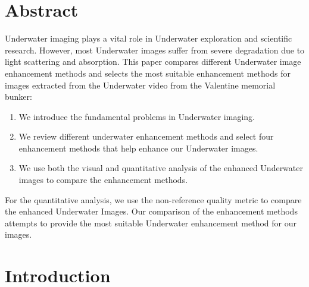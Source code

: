 \documentclass[a4paper,11pt,oneside]{article}
\begin{document}
  \section*{Abstract}
  

  Underwater imaging plays a vital role in Underwater exploration and scientific research. However, most Underwater images suffer from severe degradation due to light scattering and absorption. This paper compares different Underwater image enhancement methods and selects the most suitable enhancement methods for images extracted from the Underwater video from the Valentine memorial bunker:
  \begin{enumerate}
  \item
  We introduce the fundamental problems in Underwater imaging.
  \item
  We review different underwater enhancement methods and select four enhancement methods that help enhance our Underwater images.
  \item
  We use both the visual and quantitative analysis of the enhanced Underwater images to compare the enhancement methods.
  \end{enumerate}
  For the quantitative analysis, we use the non-reference quality metric to compare the enhanced Underwater Images. Our comparison of the enhancement methods attempts to provide the most suitable Underwater enhancement method for our images.
  \newpage
  \tableofcontents

  \clearpage

  \section{Introduction}

\end{document}
